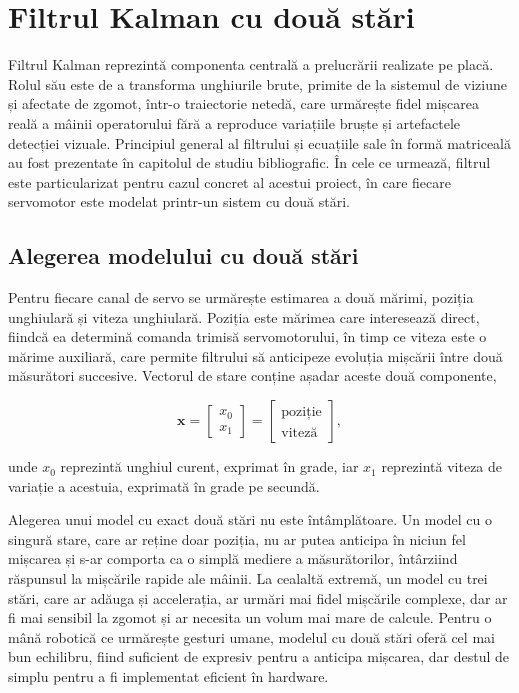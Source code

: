 \section{Filtrul Kalman cu două stări}
\label{sec:analiza-kalman}

Filtrul Kalman reprezintă componenta centrală a prelucrării realizate pe placă.
Rolul său este de a transforma unghiurile brute, primite de la sistemul de viziune
și afectate de zgomot, într-o traiectorie netedă, care urmărește fidel mișcarea
reală a mâinii operatorului fără a reproduce variațiile bruște și artefactele
detecției vizuale. Principiul general al filtrului și ecuațiile sale în formă
matriceală au fost prezentate în capitolul de studiu bibliografic. În cele ce
urmează, filtrul este particularizat pentru cazul concret al acestui proiect, în
care fiecare servomotor este modelat printr-un sistem cu două stări.

\subsection{Alegerea modelului cu două stări}

Pentru fiecare canal de servo se urmărește estimarea a două mărimi, poziția
unghiulară și viteza unghiulară. Poziția este mărimea care interesează direct,
fiindcă ea determină comanda trimisă servomotorului, în timp ce viteza este o
mărime auxiliară, care permite filtrului să anticipeze evoluția mișcării între
două măsurători succesive. Vectorul de stare conține așadar aceste două
componente,

\begin{equation}
\label{eq:kalman-stare}
\mathbf{x} =
\begin{bmatrix} x_0 \\ x_1 \end{bmatrix} =
\begin{bmatrix} \text{poziție} \\ \text{viteză} \end{bmatrix} ,
\end{equation}

unde $x_0$ reprezintă unghiul curent, exprimat în grade, iar $x_1$ reprezintă
viteza de variație a acestuia, exprimată în grade pe secundă.

Alegerea unui model cu exact două stări nu este întâmplătoare. Un model cu o
singură stare, care ar reține doar poziția, nu ar putea anticipa în niciun fel
mișcarea și s-ar comporta ca o simplă mediere a măsurătorilor, întârziind răspunsul
la mișcările rapide ale mâinii. La cealaltă extremă, un model cu trei stări, care
ar adăuga și accelerația, ar urmări mai fidel mișcările complexe, dar ar fi mai
sensibil la zgomot și ar necesita un volum mai mare de calcule. Pentru o mână
robotică ce urmărește gesturi umane, modelul cu două stări oferă cel mai bun
echilibru, fiind suficient de expresiv pentru a anticipa mișcarea, dar destul de
simplu pentru a fi implementat eficient în hardware.

